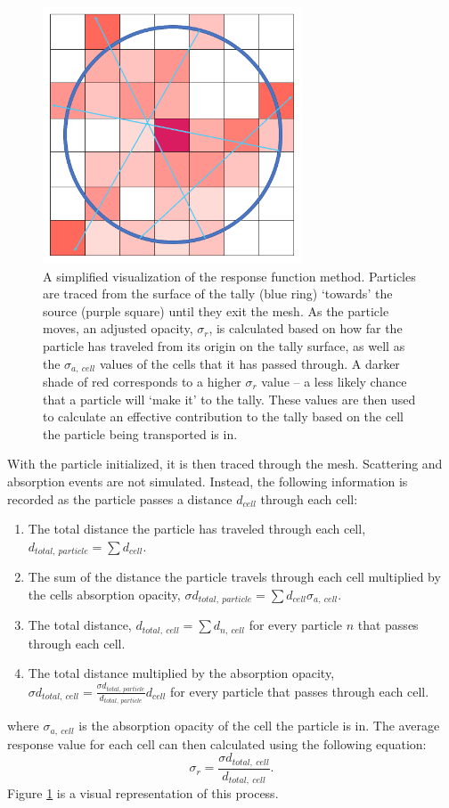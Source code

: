 \documentclass[]{article}
\begin{document}
		\begin{figure} [h!]
			\centering
			\includegraphics[height=3in]{Figures/resp_funct_pt_src_vis.png}
			\caption{A simplified visualization of the response function method. Particles are traced from the surface of the tally (blue ring) ‘towards’ the source (purple square) until they exit the mesh. As the particle moves, an adjusted opacity, $\sigma_{r}$, is calculated based on how far the particle has traveled from its origin on the tally surface, as well as the $\sigma_{a,~cell}$ values of the cells that it has passed through. A darker shade of red corresponds to a higher $\sigma_{r}$ value – a less likely chance that a particle will ‘make it’ to the tally. These values are then used to calculate an effective contribution to the tally based on the cell the particle being transported is in.}
			\label{fig:resp_funct_visual}
		\end{figure}
	
		With the particle initialized, it is then traced through the mesh. Scattering and absorption events are not simulated. Instead, the following information is recorded as the particle passes a distance $d_{cell}$ through each cell:
		\begin{enumerate}
			\item The total distance the particle has traveled through each cell, $d_{total,~particle} = \sum d_{cell}$.
			\item The sum of the distance the particle travels through each cell multiplied by the cells absorption opacity, $\sigma d_{total,~particle} = \sum d_{cell} \sigma_{a,~cell}$.
			\item The total distance, $d_{total,~cell} = \sum d_{n,~cell}$ for every particle $n$ that passes through each cell.
			\item The total distance multiplied by the absorption opacity, $\sigma d_{total,~cell} = \frac{\sigma d_{total,~particle}}{d_{total,~particle}} d_{cell}$ for every particle that passes through each cell.
		\end{enumerate}
		where $\sigma_{a,~cell}$ is the absorption opacity of the cell the particle is in. The average response value for each cell can then calculated using the following equation:
		\begin{equation}
			\sigma_{r} = \frac{\sigma d_{total,~cell}}{d_{total,~cell}}.
		\end{equation}
	  	Figure \ref{fig:resp_funct_visual} is a visual representation of this process. 
  	
\end{document}
